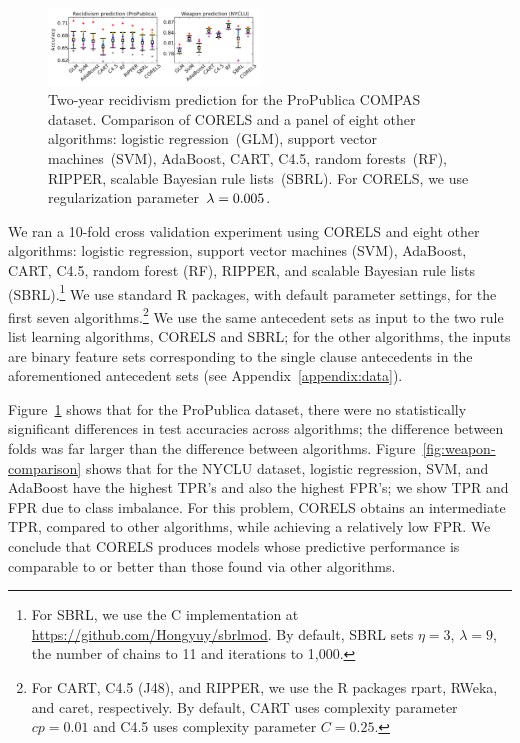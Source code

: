 \begin{figure}[t!]
\begin{center}
\includegraphics[trim={2mm, 5mm, 102mm, 0mm}, clip,
width=0.5\textwidth]{figs/compare-compas-weapon.pdf}
\end{center}
\caption{Two-year recidivism prediction for the ProPublica COMPAS dataset.
%
Comparison of CORELS and a panel of eight other algorithms:
logistic regression~(GLM), support vector machines~(SVM),
AdaBoost, CART, C4.5, random forests~(RF), RIPPER,
scalable Bayesian rule lists~(SBRL).
%
For CORELS, we use regularization parameter~${{\lambda}=0.005}$.
}
\label{fig:compas-comparison}
\end{figure}

We ran a 10-fold cross validation experiment using CORELS
and eight other algorithms:
logistic regression, support vector machines (SVM), AdaBoost, CART, C4.5,
random forest (RF), RIPPER, and scalable Bayesian rule lists (SBRL).\footnote{For
SBRL, we use the C implementation at \url{https://github.com/Hongyuy/sbrlmod}.
By default, SBRL sets ${\eta = 3}$, ${\lambda = 9}$,
the number of chains to 11 and iterations to 1,000.}
%
We use standard R packages, with default parameter settings,
for the first seven algorithms.\footnote{For CART, C4.5 (J48), and RIPPER,
we use the R packages rpart, RWeka, and caret, respectively.
%
By default, CART uses complexity parameter ${cp = 0.01}$ and C4.5 uses complexity parameter ${C = 0.25}$.
}
%
We use the same antecedent sets as input to the two rule list learning algorithms, CORELS and SBRL;
for the other algorithms, the inputs are binary feature sets corresponding to the
single clause antecedents in the aforementioned antecedent sets (see Appendix~\ref{appendix:data}).

Figure~\ref{fig:compas-comparison} shows that for the ProPublica dataset,
there were no statistically significant differences in test accuracies across algorithms;
the difference between folds was far larger than the difference between algorithms.
%
Figure~\ref{fig:weapon-comparison} shows that for the NYCLU dataset,
logistic regression, SVM, and AdaBoost have the highest TPR's and also the highest FPR's;
we show TPR and FPR due to class imbalance.
%
For this problem, CORELS obtains an intermediate TPR, compared to other algorithms,
while achieving a relatively low FPR.
%
We conclude that CORELS produces models whose predictive performance is comparable to or better than
those found via other algorithms.

